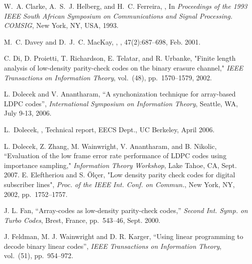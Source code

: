 \begin{thebibliography}{10}
W.~A. Clarke, A.~S.~J. Helberg, and H.~C. Ferreira,
,
\newblock In {\em {Proceedings of the 1993 IEEE South African Symposium on
  Communications and Signal Processing. COMSIG}}, New York, NY, USA, 1993.

M.~C. Davey and D.~J.~C. MacKay,
,
, 47(2):687--698, Feb. 2001.


 C. Di, D. Proietti, T. Richardson, E. Telatar,
and R. Urbanke, "Finite length analysis of low-density parity-check
codes on the binary erasure channel," \emph{IEEE Transactions on
Information Theory}, vol.\ (48), pp.~1570--1579, 2002.


 L. Dolecek and V. Anantharam, ``A synchonization
technique for array-based LDPC codes'', \emph{International
Symposium on Information Theory}, Seattle, WA, July 9-13, 2006.


L.~Dolecek,
,
\newblock Technical report, EECS Dept., UC Berkeley, April 2006.

L. Dolecek, Z. Zhang, M. Wainwright, V. Anantharam, and B. Nikolic,
``Evaluation of the low frame error rate performance of LDPC codes
using importance sampling," \emph{Information Theory Workshop}, Lake
Tahoe, CA, Sept. 2007.
E. Eleftheriou and S. \"{O}l\c{c}er, "Low density parity check codes
for digital subscriber lines", \emph{Proc. of the IEEE Int. Conf. on
Commun.}, New York, NY, 2002, pp.~1752--1757.

J. L. Fan, ``Array-codes as low-density parity-check codes,''
\emph{Second Int. Symp. on Turbo Codes}, Brest, France, pp.~543--46,
Sept. 2000.

J. Feldman, M. J. Wainwright and D. R. Karger, ``Using linear
programming to decode binary linear codes'', \emph{IEEE Transactions
on Information Theory}, vol.\ (51), pp.~954--972.



\end{thebibliography}
